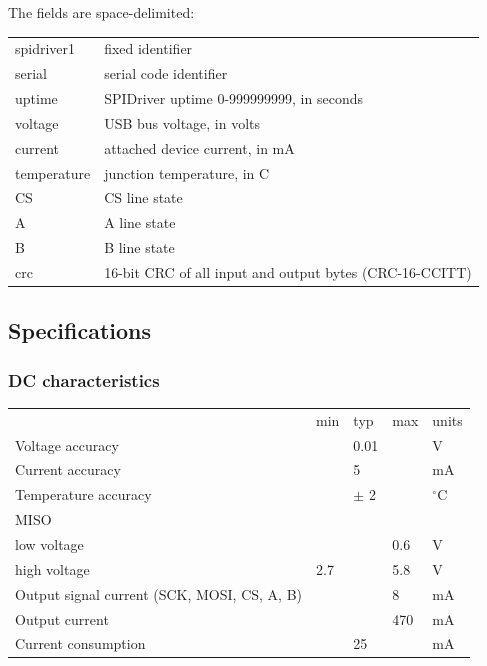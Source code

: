 \documentclass{article}
\newcommand{\heavyline}{\specialrule{1pt}{1pt}{1pt}}
\newcommand{\gap}{\vspace{10pt}}
\begin{document}
The fields are space-delimited:

\gap\begin{tabular}{ll}
\hline
spidriver1      & fixed identifier \\
serial          & serial code identifier \\
uptime          & SPIDriver uptime 0-999999999, in seconds \\
voltage         & USB bus voltage, in volts \\
current         & attached device current, in mA \\
temperature     & junction temperature, in C \\
CS              & CS line state \\
A               & A line state \\
B               & B line state \\
crc             & 16-bit CRC of all input and output bytes (CRC-16-CCITT)  \index{CRC}\\
\hline
\end{tabular}\gap

\newpage
\subsection{Specifications}\label{electrical-characteristics}

\subsubsection*{DC characteristics}
\vspace{10 pt}
{\renewcommand{\arraystretch}{1.2}%

\begin{tabularx}{\linewidth}{XC{40pt}C{40pt}C{40pt}C{40pt}}
\heavyline
& min & typ & max & units \\ \heavyline

Voltage accuracy              && 0.01 && V            \\ \hline
Current accuracy              && 5 && mA              \\ \hline
Temperature accuracy          && $\pm$ 2 && $^{\circ}$C            \\ \hline
MISO & & & & \\
\hspace{10pt}low voltage & & & 0.6 & V \\
\hspace{10pt}high voltage & 2.7 &   & 5.8 & V \\ \hline
Output signal current (SCK, MOSI, CS, A, B)  &&& 8 & mA \\ \hline
Output current        & & & 470 & mA                  \\ \hline
Current consumption   & & 25 & & mA                   \\ \hline

\end{tabularx}}
\vspace{10 pt}
\end{document}
